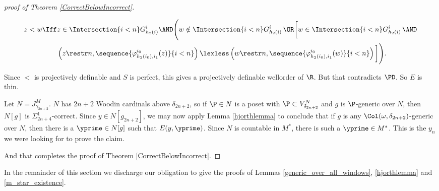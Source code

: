 \documentclass[oneside,12pt]{amsart}
\begin{document}
\begin{proof}[proof of Theorem \ref{CorrectBelowIncorrect}]
\begin{subproof}
\begin{align*}
z<w \Iff &z\in \Intersection{i<n} G^i_{h_2(i)} \AND \Bigg( w \notin \Intersection{i<n} G^i_{h_2(i)} \, \OR   \bigg[w \in \Intersection{i<n} G^i_{h_2(i)} \, \AND\\
&\left( z\restr n, \sequence{\varphi^{i_0}_{h_2(i_0),i_1}(z)}{i<n}\right) \lexless \left( w\restr n, \sequence{\varphi^{i_0}_{h_2(i_0),i_1}(w)}{i<n}\right) \bigg]\Bigg).
\end{align*}

Since $<$ is projectively definable and $S$ is perfect, this gives a projectively definable wellorder of $\R$. But that
contradicts $\PD$. So $E$ is thin.

Let $N=J^M_{\gamma_{2n+2}}$. $N$ has $2n+2$ Woodin cardinals above $\delta_{2n+2}$,
so if $\P\in N$ is a poset with $\P\subset V^N_{\delta_{2n+2}}$ and $g$ is $\P$-generic over $N$, then $N[g]$
is $\Sigma^1_{2n+4}$-correct.
Since $y\in N[g_{2n+2}]$,
we may now apply Lemma \ref{hjorthlemma} to conclude that if $g$ is any $\Col(\omega,\delta_{2n+2})$-generic over $N$,
then there is a $\yprime\in N[g]$ such that $E(y,\yprime)$.
Since $N$ is countable in $M^*$, there is such a $\yprime\in M^*$. This is
the $y_n$ we were looking for to prove the claim.

\end{subproof}

And that completes the proof of Theorem \ref{CorrectBelowIncorrect}.

\end{proof}

In the remainder of this section we discharge our obligation to give the proofs of
Lemmas \ref{generic_over_all_windows}, \ref{hjorthlemma} and
\ref{m_star_existence}.
\end{document}
